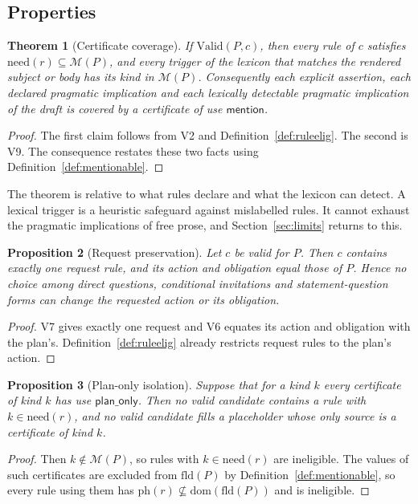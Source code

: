 \documentclass[11pt]{article}
\newtheorem{theorem}{Theorem}[section]
\newtheorem{proposition}[theorem]{Proposition}
\theoremstyle{definition}
\theoremstyle{remark}
\newcommand{\mention}{\mathsf{mention}}
\newcommand{\planonly}{\mathsf{plan\_only}}
\newcommand{\Valid}{\mathrm{Valid}}
\newcommand{\Mset}{\mathcal{M}}
\newcommand{\need}{\mathrm{need}}
\begin{document}
\subsection{Properties}

\begin{theorem}[Certificate coverage]\label{thm:cover}
If $\Valid(P,c)$, then every rule of $c$ satisfies $\need(r)\subseteq\Mset(P)$, and every trigger of the lexicon that matches the rendered subject or body has its kind in $\Mset(P)$. Consequently each explicit assertion, each declared pragmatic implication and each lexically detectable pragmatic implication of the draft is covered by a certificate of use $\mention$.
\end{theorem}
\begin{proof}
The first claim follows from V2 and Definition~\ref{def:ruleelig}. The second is V9. The consequence restates these two facts using Definition~\ref{def:mentionable}.
\end{proof}

The theorem is relative to what rules declare and what the lexicon can detect. A lexical trigger is a heuristic safeguard against mislabelled rules. It cannot exhaust the pragmatic implications of free prose, and Section~\ref{sec:limits} returns to this.

\begin{proposition}[Request preservation]\label{prop:req}
Let $c$ be valid for $P$. Then $c$ contains exactly one request rule, and its action and obligation equal those of $P$. Hence no choice among direct questions, conditional invitations and statement-question forms can change the requested action or its obligation.
\end{proposition}
\begin{proof}
V7 gives exactly one request and V6 equates its action and obligation with the plan's. Definition~\ref{def:ruleelig} already restricts request rules to the plan's action.
\end{proof}

\begin{proposition}[Plan-only isolation]\label{prop:isolation}
Suppose that for a kind $k$ every certificate of kind $k$ has use $\planonly$. Then no valid candidate contains a rule with $k\in\need(r)$, and no valid candidate fills a placeholder whose only source is a certificate of kind $k$.
\end{proposition}
\begin{proof}
Then $k\notin\Mset(P)$, so rules with $k\in\need(r)$ are ineligible. The values of such certificates are excluded from $\mathrm{fld}(P)$ by Definition~\ref{def:mentionable}, so every rule using them has $\mathrm{ph}(r)\not\subseteq\mathrm{dom}(\mathrm{fld}(P))$ and is ineligible.
\end{proof}
\end{document}
